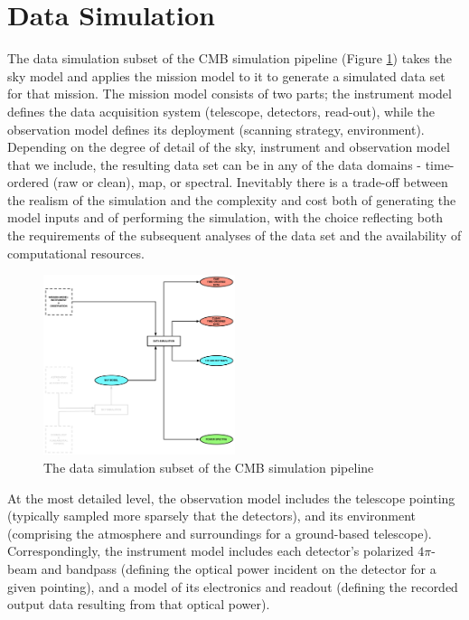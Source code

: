  
\section{Data Simulation}
\label{sec_datasim}

The data simulation subset of the CMB simulation pipeline (Figure \ref{fig_ds}) takes the sky model and applies the mission model to it to generate a simulated data set for that mission. The mission model consists of two parts; the instrument model defines the data acquisition system (telescope, detectors, read-out), while the observation model defines its deployment (scanning strategy, environment). Depending on the degree of detail of the sky, instrument and observation model that we include, the resulting data set can be in any of the data domains - time-ordered (raw or clean), map, or spectral. Inevitably there is a trade-off between the realism of the simulation and the complexity and cost both of generating the model inputs and of performing the simulation, with the choice reflecting both the requirements of the subsequent analyses of the data set and the availability of computational resources.

\begin{figure}[htbp]
\centering
\includegraphics[width=0.5\textwidth]{Analysis/ds}
\caption{The data simulation subset of the CMB simulation pipeline}
\label{fig_ds}
\end{figure}

At the most detailed level, the observation model includes the telescope pointing (typically sampled more sparsely that the detectors), and its environment (comprising the atmosphere and surroundings for a ground-based telescope). Correspondingly, the instrument model includes each detector's polarized $4 \pi$-beam and bandpass (defining the optical power incident on the detector for a given pointing), and a model of its electronics and readout (defining the recorded output data resulting from that optical power).


